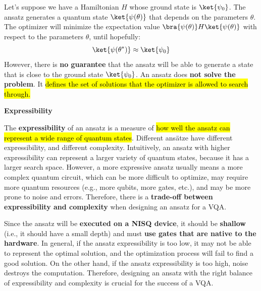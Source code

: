 \highspace
Let's suppose we have a Hamiltonian $H$ whose ground state is $\ket{\psi_{0}}$. The ansatz generates a quantum state $\ket{\psi(\theta)}$ that depends on the parameters $\theta$. The optimizer will minimize the expectation value $\bra{\psi(\theta)} H \ket{\psi(\theta)}$ with respect to the parameters $\theta$, until hopefully:
\begin{equation*}
    \ket{\psi(\theta^{*})} \approx \ket{\psi_{0}}
\end{equation*}
\textcolor{Red2}{} However, there is \textbf{no guarantee} that the ansatz will be able to generate a state that is close to the ground state $\ket{\psi_{0}}$. An ansatz does \textbf{not solve the problem}. It \hl{defines the set of solutions that the optimizer is allowed to search through.}

\highspace
\begin{flushleft}
    \textcolor{Red2}{ \textbf{Expressibility}}
\end{flushleft}
The \textbf{expressibility} of an ansatz is a measure of \hl{how well the ansatz can represent a wide range of quantum states}. Different ansätze have different expressibility, and different complexity. Intuitively, an ansatz with higher expressibility can represent a larger variety of quantum states, because it has a larger search space. However, a more expressive ansatz usually means a more complex quantum circuit, which can be more difficult to optimize, may require more quantum resources (e.g., more qubits, more gates, etc.), and may be more prone to noise and errors. Therefore, there is a \textbf{trade-off between expressibility and complexity} when designing an ansatz for a VQA.

\highspace
Since the ansatz will be \textbf{executed on a NISQ device}, it should be \textbf{shallow} (i.e., it should have a small depth) and must \textbf{use gates that are native to the hardware}. In general, if the ansatz expressibility is too low, it may not be able to represent the optimal solution, and the optimization process will fail to find a good solution. On the other hand, if the ansatz expressibility is too high, noise destroys the computation. Therefore, designing an ansatz with the right balance of expressibility and complexity is crucial for the success of a VQA.